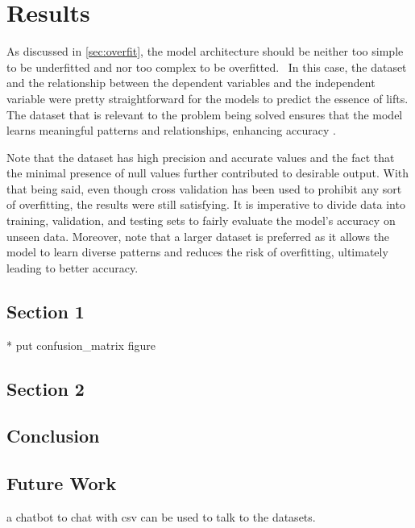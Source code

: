 %
\chapter{Results}
\label{sec:results}

As discussed in \ref{sec:overfit}, the model architecture should be neither too simple to be underfitted and nor too complex to be overfitted. 
In this case, the dataset and the relationship between the dependent variables and the independent variable were pretty straightforward for the models to predict the essence of lifts. 
The dataset that is relevant to the problem being solved ensures that the model learns meaningful patterns and relationships, enhancing accuracy
\cite{gudivada2017data}.

Note that the dataset has high precision and accurate values and the fact that the minimal presence of null values further contributed to desirable output. With that being said, even though cross validation has been used to prohibit any sort of overfitting, the results were still satisfying.
It is imperative to divide data into training, validation, and testing sets to fairly evaluate the model's accuracy on unseen data. Moreover, note that a larger dataset is preferred as it allows the model to learn diverse patterns and reduces the risk of overfitting, ultimately leading to better accuracy.





\section{Section 1}
\label{sec:results:sec1}


* put confusion\_matrix figure




\section{Section 2}
\label{sec:results:sec3}



\section{Conclusion}
\label{sec:results:conclusion}




\section{Future Work}
\label{sec:results:future}

a chatbot to chat with csv can be used to talk to the datasets.
